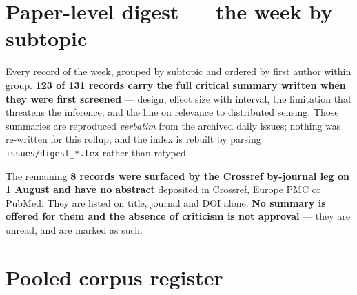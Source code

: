 \documentclass[10pt]{article}
\begin{document}
\clearpage

\section*{\sffamily\bfseries\color{Deep}Paper-level digest --- the week by subtopic}
\vspace{-1.5mm}{\color{Teal}\rule{\linewidth}{1.1pt}}\vspace{2mm}

\footnotesize
Every record of the week, grouped by subtopic and ordered by first author within group.
\textbf{123 of 131 records carry the full critical summary written when they were first
screened} --- design, effect size with interval, the limitation that threatens the
inference, and the line on relevance to distributed sensing. Those summaries are
reproduced \emph{verbatim} from the archived daily issues; nothing was re-written for this
rollup, and the index is rebuilt by parsing \texttt{issues/digest\_*.tex} rather than
retyped.

The remaining \textbf{8 records were surfaced by the Crossref by-journal leg on 1 August
and have no abstract} deposited in Crossref, Europe PMC or PubMed. They are listed on
title, journal and DOI alone. \textbf{No summary is offered for them and the absence of
criticism is not approval} --- they are unread, and are marked as such.

\vspace{3mm}



\clearpage

\section*{\sffamily\bfseries\color{Deep}Pooled corpus register}
\vspace{-1.5mm}{\color{Teal}\rule{\linewidth}{1.1pt}}\vspace{2.5mm}


\end{document}
